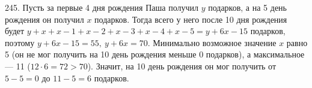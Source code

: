 245. Пусть за первые 4 дня рождения Паша получил $y$ подарков, а на 5 день рождения он получил $x$ подарков. Тогда всего у него после 10 дня рождения будет $y+x+x-1+x-2+x-3+x-4+x-5=y+6x-15$ подарков, поэтому $y+6x-15=55,\ y+6x=70.$ Минимально возможное значение $x$ равно 5 (он не мог получить на 10 день рождения меньше 0 подарков), а максимальное --- 11 ($12\cdot6=72>70$). Значит, на 10 день рождения он мог получить от $5-5=0$ до $11-5=6$ подарков.\\
